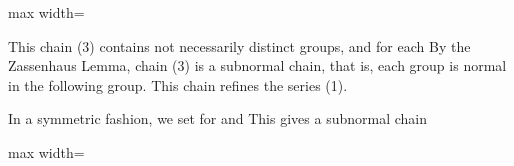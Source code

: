 \documentclass[11pt,oneside]{article}
\begin{document}
\begin{BookBody}
\begin{center}\begin{adjustbox}{max width=\linewidth}\end{adjustbox}\end{center}

\noindent This chain (3) contains  not necessarily distinct groups, and  for each  By the Zassenhaus Lemma, chain (3) is a subnormal chain, that is, each group is normal in the following group. This chain refines the series (1).

In a symmetric fashion, we set  for  and  This gives a subnormal chain

\begin{center}\begin{adjustbox}{max width=\linewidth}\end{adjustbox}\end{center}


\end{BookBody}
\end{document}
